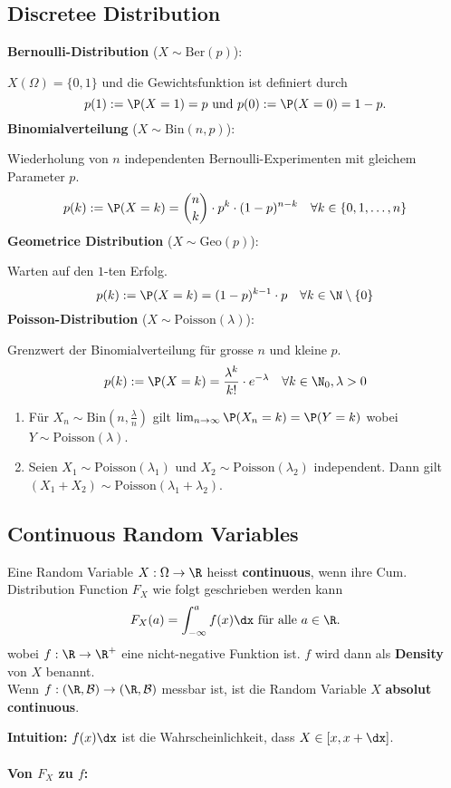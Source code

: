 \subsection{Discretee Distribution}
\textbf{Bernoulli-Distribution} ($X \sim \text{Ber}(p)$): 

$X(\Omega)= \{0, 1\}$ und die Gewichtsfunktion ist definiert durch
$$p(1):= \P(X = 1) = p \text{ und } p(0):=\P(X = 0) = 1 - p.$$
\textbf{Binomialverteilung} ($X \sim \text{Bin}(n, p)$): 

Wiederholung von $n$ independenten Bernoulli-Experimenten mit gleichem Parameter $p$. 
$$p(k):= \P(X = k) = \binom{n}{k} \cdot p^k \cdot (1-p)^{n-k} \quad \forall k \in \{0,1,\ldots, n\}$$
\textbf{Geometrice Distribution} ($X \sim \text{Geo}(p)$): 

Warten auf den $1$-ten Erfolg. 
$$p(k):= \P(X = k) = (1-p)^{k-1}\cdot p \quad \forall k \in \N\setminus\{0\}$$
\textbf{Poisson-Distribution} ($X \sim \text{Poisson}(\lambda)$): 

Grenzwert der Binomialverteilung für grosse $n$ und kleine $p$. 
$$p(k) := \P(X = k) = \frac{\lambda^k}{k!}\cdot e^{-\lambda} \quad \forall k \in \N_0, \lambda > 0$$
\begin{enumerate}
    \item Für $X_n \sim \text{Bin}(n, \frac{\lambda}{n})$ gilt $\lim_{n \to \infty}\P(X_n = k) = \P(Y = k)$ wobei $Y \sim \text{Poisson}(\lambda)$.
    \item Seien $X_1 \sim \text{Poisson}(\lambda_1)$ und $X_2 \sim \text{Poisson}(\lambda_2)$ independent. Dann gilt $(X_1 + X_2) \sim \text{Poisson}(\lambda_1 +\lambda_2)$.
\end{enumerate}

\subsection{Continuous Random Variables}
\begin{mainbox}{}
    Eine Random Variable $X: \Omega \to \R$ heisst \textbf{continuous}, wenn ihre Cum. Distribution Function $F_X$ wie folgt geschrieben werden kann
    $$F_X(a) = \int_{-\infty}^{a}f(x)\dx \text{ für alle }a \in \R.$$
    wobei $f: \R \to \R^+$ eine nicht-negative Funktion ist. $f$ wird dann als \textbf{Density} von $X$ benannt.\\
    Wenn $f: (\R, \mathcal{B}) \to (\R, \mathcal{B})$ messbar ist, ist die Random Variable $X$ \textbf{absolut continuous}.
\end{mainbox}
\textbf{Intuition:} $f(x)\dx$ ist die Wahrscheinlichkeit, dass $X \in [x, x + \dx]$.
\\ \\
\textbf{Von $F_X$ zu $f$:} 

